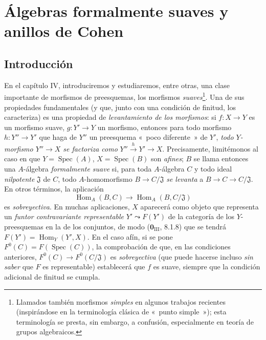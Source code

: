 
\section{Álgebras formalmente suaves y anillos de Cohen}
\label{section:0.19-fr}
\label{0.19-fr}

\setcounter{subsection}{-1}
\subsection{Introducción}
\label{subsection:0.19.0-fr}
\label{0.19.0-fr}



\begin{env}[19.0.1]
\label{0.19.0.1-fr}
En el capítulo IV, introduciremos y estudiaremos, entre otras, una clase
importante de morfismos de preesquemas, los morfismos \emph{suaves}\footnote{Llamados
también morfismos \emph{simples} en algunos trabajos recientes (inspirándose
en la terminología clásica de «~punto simple~»); esta terminología se presta,
sin embargo, a confusión, especialmente en teoría de grupos algebraicos.}. Una de
sus propiedades fundamentales (y que, junto con una condición de finitud, los
caracteriza) es una propiedad de \emph{levantamiento de los morfismos}: si
$f:X\to Y$ es un morfismo suave, $g:Y'\to Y$ un morfismo, entonces para todo
morfismo $h:Y''\to Y'$ que haga de $Y''$ un preesquema «~poco diferente~» de
$Y'$, \emph{todo $Y$-morfismo $Y''\to X$ se factoriza como}
$Y''\xrightarrow{h}Y'\to X$. Precisamente, limitémonos al caso en que
$Y=\operatorname{Spec}(A)$, $X=\operatorname{Spec}(B)$ son \emph{afines};
$B$ se llama entonces una $A$-álgebra \emph{formalmente suave} si, para toda
$A$-álgebra $C$ y todo ideal \emph{nilpotente} $\mathfrak J$ de $C$, todo
$A$-homomorfismo $B\to C/\mathfrak J$ \emph{se levanta} a
$B\to C\to C/\mathfrak J$. En otros términos, la aplicación
\[
  \operatorname{Hom}_A(B,C)\longrightarrow
  \operatorname{Hom}_A(B,C/\mathfrak J)
\]
es \emph{sobreyectiva}. En muchas aplicaciones, $X$ aparecerá como objeto
que representa un \emph{funtor contravariante representable} $Y'\leadsto F(Y')$
de la categoría de los $Y$-preesquemas en la de los conjuntos, de modo
($\mathbf{0}_{\mathrm{III}}$, 8.1.8) que se tendrá
$F(Y')=\operatorname{Hom}_Y(Y',X)$. En el caso afín, si se pone
$F^0(C)=F(\operatorname{Spec}(C))$, la comprobación de que, en las
condiciones anteriores, $F^0(C)\to F^0(C/\mathfrak J)$ es \emph{sobreyectiva}
(que puede hacerse incluso \emph{sin saber} que $F$ es representable) establecerá
que $f$ es suave, siempre que la condición adicional de finitud
se cumpla.
\end{env}

